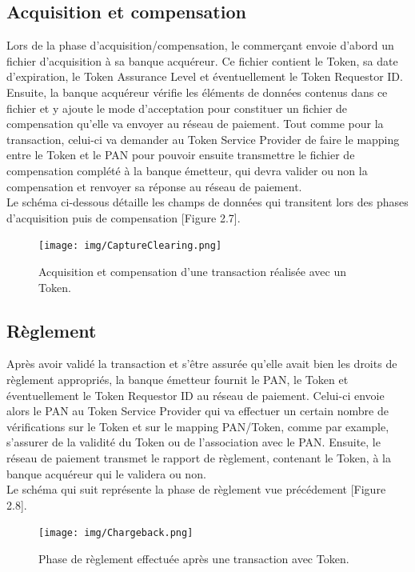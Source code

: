 \documentclass{report}
\begin{document}
\subsection{Acquisition et compensation}
Lors de la phase d'acquisition/compensation, le commerçant envoie d'abord un fichier d'acquisition à sa banque acquéreur. Ce fichier contient le Token, sa date d'expiration, le Token Assurance Level et éventuellement le Token Requestor ID. Ensuite, la banque acquéreur vérifie les éléments de données contenus dans ce fichier et y ajoute le mode d'acceptation pour constituer un fichier de compensation qu'elle va envoyer au réseau de paiement. Tout comme pour la transaction, celui-ci va demander au Token Service Provider de faire le mapping entre le Token et le PAN pour pouvoir ensuite transmettre le fichier de compensation complété à la banque émetteur, qui devra valider ou non la compensation et renvoyer sa réponse au réseau de paiement.\\

\noindent
Le schéma ci-dessous détaille les champs de données qui transitent lors des phases d'acquisition puis de compensation [Figure 2.7].

\begin{figure}[!ht]
    \centering
			\texttt{[image: img/CaptureClearing.png]}
			\caption{\label{CaptureClearing} Acquisition et compensation d'une transaction réalisée avec un Token.}			
\end{figure}

\subsection{Règlement}
Après avoir validé la transaction et s'être assurée qu'elle avait bien les droits de règlement appropriés, la banque émetteur fournit le PAN, le Token et éventuellement le Token Requestor ID au réseau de paiement. Celui-ci envoie alors le PAN au Token Service Provider qui va effectuer un certain nombre de vérifications sur le Token et sur le mapping PAN/Token, comme par example, s'assurer de la validité du Token ou de l'association avec le PAN. Ensuite, le réseau de paiement transmet le rapport de règlement, contenant le Token, à la banque acquéreur qui le validera ou non.\\

\noindent
Le schéma qui suit représente la phase de règlement vue précédement [Figure 2.8].

\begin{figure}[!ht]
    \centering
			\texttt{[image: img/Chargeback.png]}
			\caption{\label{Reglement} Phase de règlement effectuée après une transaction avec Token.}			
\end{figure}
\end{document}
